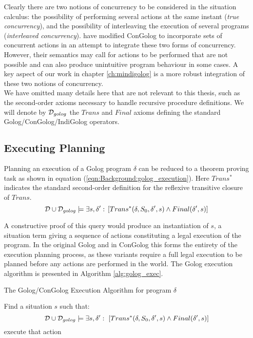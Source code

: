 Clearly there are two notions of concurrency to be considered in the
situation calculus: the possibility of performing several actions
at the same instant (\emph{true concurrency}), and the possibility
of interleaving the execution of several programs (\emph{interleaved
concurrency}). \citet{pinto99tcongolog} have modified ConGolog to
incorporate sets of concurrent actions in an attempt to integrate
these two forms of concurrency. However, their semantics may call
for actions to be performed that are not possible and can also produce
unintuitive program behaviour in some cases. A key aspect of our work
in chapter \ref{ch:mindigolog} is a more robust integration of these
two notions of concurrency.\\


We have omitted many details here that are not relevant to this thesis,
such as the second-order axioms necessary to handle recursive procedure
definitions. We will denote by $\mathcal{D}_{golog}$ the $Trans$ and $Final$
axioms defining the standard Golog/ConGolog/IndiGolog operators.


\subsection{Executing Planning}

Planning an execution of a Golog program $\delta$ can be reduced
to a theorem proving task as shown in equation (\ref{eqn:Background:golog_execution}).
Here $Trans^{*}$ indicates the standard second-order definition for
the reflexive transitive closure of $Trans$.\begin{equation}
\mathcal{D}\cup\mathcal{D}_{golog}\models\exists s,\delta':\,\left[Trans^{*}(\delta,S_{0},\delta',s)\wedge Final(\delta',s)\right]\label{eqn:Background:golog_execution}\end{equation}


A constructive proof of this query would produce an instantiation
of $s$, a situation term giving a sequence of actions constituting
a legal execution of the program. In the original Golog and in ConGolog
this forms the entirety of the execution planning process, as these
variants require a full legal execution to be planned before any actions
are performed in the world. The Golog execution algorithm is presented
in Algorithm \ref{alg:golog_exec}.

%
\begin{algorithm}[t]
 

\caption{The Golog/ConGolog Execution Algorithm for program $\delta$}


\label{alg:golog_exec} \begin{algorithmic} \STATE Find a situation
$s$ such that:\[
\mathcal{D}\cup\mathcal{D}_{golog}\models\exists s,\delta':\ \left[Trans^{*}(\delta,S_{0},\delta',s)\wedge Final(\delta',s)\right]\]
  \STATE execute
that action \ENDFOR \end{algorithmic} 
\end{algorithm}


